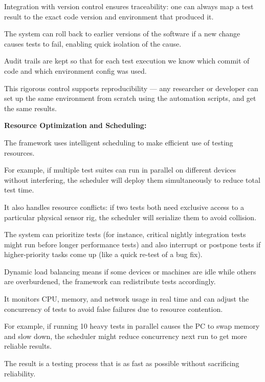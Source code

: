 {{{Integration with version control ensures traceability: one can always map a test result to the exact code version and environment that produced it.

The system can roll back to earlier versions of the software if a new change causes tests to fail, enabling quick isolation of the cause.

Audit trails are kept so that for each test execution we know which commit of code and which environment config was used.

This rigorous control supports reproducibility --- any researcher or developer can set up the same environment from scratch using the automation scripts, and get the same results.

\textbf{Resource Optimization and Scheduling:}

The framework uses intelligent scheduling to make efficient use of testing resources.

For example, if multiple test suites can run in parallel on different devices without interfering, the scheduler will deploy them simultaneously to reduce total test time.

It also handles resource conflicts: if two tests both need exclusive access to a particular physical sensor rig, the scheduler will serialize them to avoid collision.

The system can prioritize tests (for instance, critical nightly integration tests might run before longer performance tests) and also interrupt or postpone tests if higher-priority tasks come up (like a quick re-test of a bug fix).

Dynamic load balancing means if some devices or machines are idle while others are overburdened, the framework can redistribute tests accordingly.

It monitors CPU, memory, and network usage in real time and can adjust the concurrency of tests to avoid false failures due to resource contention.

For example, if running 10 heavy tests in parallel causes the PC to swap memory and slow down, the scheduler might reduce concurrency next run to get more reliable results.

The result is a testing process that is as fast as possible without sacrificing reliability.

}}}
